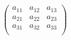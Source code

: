 $$\left(\begin{matrix}a_{11}&a_{12}&a_{13}\\a_{21}&a_{22}&a_{23}\\a_{31}&a_{32}&a_{33}\\\end{matrix}\right)$$
